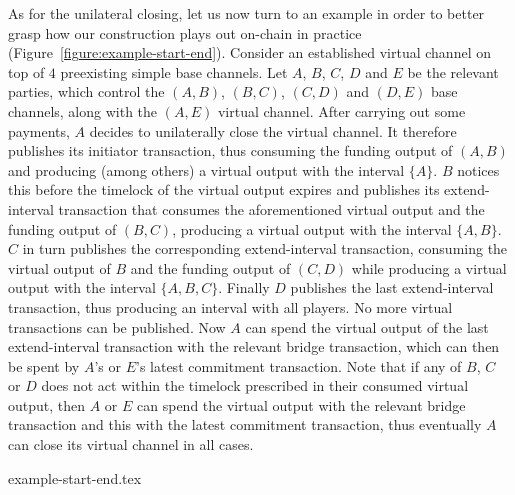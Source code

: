  As for the unilateral closing, let us now turn to an example in order to
  better grasp how our construction plays out on-chain in practice
  (Figure~\ref{figure:example-start-end}). Consider an
  established virtual channel on top of $4$ preexisting simple base channels.
  Let $A$, $B$, $C$, $D$ and $E$ be the relevant parties, which control the $(A,
  B)$, $(B, C)$, $(C, D)$ and $(D, E)$ base channels, along with the $(A, E)$
  virtual channel. After carrying out some payments, $A$ decides to unilaterally
  close the virtual channel. It therefore publishes its initiator transaction,
  thus consuming the funding output of $(A, B)$ and producing (among others) a
  virtual output with the interval $\{A\}$. $B$ notices this before the timelock
  of the virtual output expires and publishes its extend-interval
  transaction that consumes the aforementioned virtual output and the funding
  output of $(B, C)$, producing a virtual output with the interval $\{A, B\}$.
  $C$ in turn publishes the corresponding extend-interval transaction, consuming
  the virtual output of $B$ and the funding output of $(C, D)$ while producing a
  virtual output with the interval $\{A, B, C\}$. Finally $D$ publishes the last
  extend-interval transaction, thus producing an interval with all players.
  No more virtual transactions can be published. Now $A$ can spend the virtual
  output of the last extend-interval transaction with the relevant bridge
  transaction, which can then be spent by $A$'s or $E$'s latest commitment
  transaction. Note that if any of $B$, $C$ or $D$ does not act within the
  timelock prescribed in their consumed virtual output, then $A$ or $E$ can
  spend the virtual output with the relevant bridge transaction and this with
  the latest commitment transaction, thus eventually $A$ can close its virtual
  channel in all cases.

  \begin{figure*}
    {example-start-end.tex}
    \caption{$4$ simple channels supporting a virtual. $A$ starts closing
    by publishing its initiator tx, then parties $B$--$D$ each
    publishes its extend-interval tx with the relevant interval. No party is
    negligent. Virtual outputs are marked with their interval.}
    \label{figure:example-start-end}
  \end{figure*}

